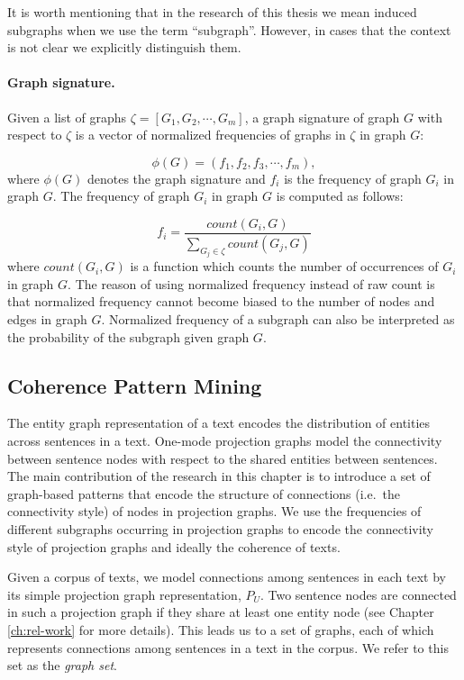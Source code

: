It is worth mentioning that in the research of this thesis we mean induced subgraphs when we use the term ``subgraph''.  
However, in cases that the context is not clear we explicitly distinguish them. 

\paragraph{Graph signature.}
%
Given a list of graphs $ \zeta  = \left[ G_1, G_2, \cdots , G_m \right]$,  a graph signature of graph $G$ with respect to $\zeta$ is a vector of normalized frequencies of graphs in $\zeta$ in graph $G$:

\begin{equation}
	\phi \left( G \right) = \left( f_1, f_2, f_3, \cdots, f_m \right),
\end{equation}
where  $\phi \left( G \right)$ denotes the graph signature and $f_i$ is the frequency of graph $G_i$ in graph $G$. 
The frequency of graph $G_i$ in graph $G$ is computed as follows:

\begin{equation}
 f_i = \frac{count(G_i, G)}{\sum_{G_j \in \zeta}{count(G_j, G)}}
\end{equation}
where $count(G_i, G)$ is a function which counts the number of occurrences of $G_i$ in graph $G$. 
The reason of using normalized frequency instead of raw count is that normalized frequency cannot become biased to the number of nodes and edges in graph $G$. 
Normalized frequency of a subgraph can also be interpreted as the probability of the subgraph given graph $G$.  

\subsection{Coherence Pattern Mining}

The entity graph representation of a text encodes the distribution of entities across sentences in a text. 
One-mode projection graphs model the connectivity between sentence nodes with respect to the shared entities between sentences. 
The main contribution of the research in this chapter is to introduce a set of graph-based patterns that encode the structure of connections (i.e.\ the connectivity style) of nodes in projection graphs.  
We use the frequencies of different subgraphs occurring in projection graphs to encode the connectivity style of projection graphs and ideally the coherence of texts. 

Given a corpus of texts, we model connections among sentences in each text by its simple projection graph representation, $P_U$. 
Two sentence nodes are connected in such a projection graph if they share at least one entity node (see Chapter \ref{ch:rel-work} for more details).  
This leads us to a set of graphs, each of which represents connections among sentences in a text in the corpus.   
We refer to this set as the \emph{graph set}. 

